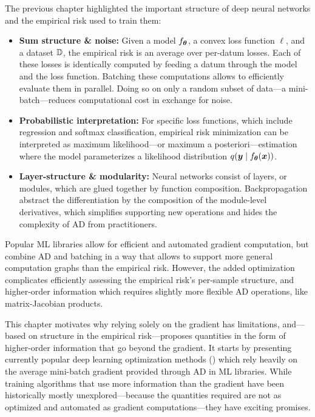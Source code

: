 The previous chapter highlighted the important structure of deep neural networks
and the empirical risk used to train them:
\begin{itemize}

\item \textbf{Sum structure \& noise:} Given a model $f_{{\bm{\theta}}}$, a convex
  loss function $\ell$, and a dataset ${\mathbb{D}}$, the empirical risk is an average
  over per-datum losses. Each of these losses is identically computed by feeding
  a datum through the model and the loss function. Batching these computations
  allows to efficiently evaluate them in parallel. Doing so on only a random
  subset of data---a mini-batch---reduces computational cost in exchange for
  noise.

\item \textbf{Probabilistic interpretation:} For specific loss functions, which
  include regression and softmax classification, empirical risk minimization can
  be interpreted as maximum likelihood---or maximum a posteriori---estimation
  where the model parameterizes a likelihood distribution
  $q({\bm{y}}\;|\;f_{{\bm{\theta}}}({\bm{x}}))$.

\item \textbf{Layer-structure \& modularity:} Neural networks consist of layers,
  or modules, which are glued together by function composition. Backpropagation
  abstract the differentiation by the composition of the module-level
  derivatives, which simplifies supporting new operations and hides the
  complexity of AD from practitioners.
\end{itemize}
Popular ML libraries allow for efficient and automated gradient computation, but
combine AD and batching in a way that allows to support more general computation
graphs than the empirical risk. However, the added optimization complicates
efficiently assessing the empirical risk's per-sample structure, and
higher-order information which requires slightly more flexible AD operations,
like matrix-Jacobian products.

This chapter motivates why relying solely on the gradient has limitations,
and---based on structure in the empirical risk---proposes quantities in the form
of higher-order information that go beyond the gradient. It starts by presenting
currently popular deep learning optimization methods
() which rely heavily on the average
mini-batch gradient provided through AD in ML libraries. While training
algorithms that use more information than the gradient have been historically
mostly unexplored---because the quantities required are not as optimized and
automated as gradient computations---they have exciting promises.


